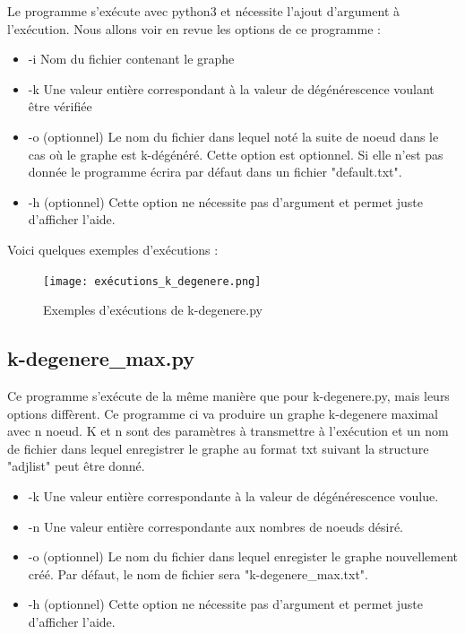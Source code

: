 \documentclass[a4paper, 11pt, oneside]{article}
\begin{document}
Le programme s'exécute avec python3 et nécessite l'ajout d'argument à l'exécution.
Nous allons voir en revue les options de ce programme :
\begin{itemize}
    \item -i Nom du fichier contenant le graphe
    \item -k Une valeur entière correspondant à la valeur de dégénérescence voulant être vérifiée
    \item -o (optionnel) Le nom du fichier dans lequel noté la suite de noeud dans le cas où 
    le graphe est k-dégénéré. Cette option est optionnel. Si elle n'est pas donnée 
    le programme écrira par défaut dans un fichier "default.txt".
    \item -h (optionnel) Cette option ne nécessite pas d'argument et permet juste d'afficher l'aide.
\end{itemize}

Voici quelques exemples d'exécutions :
\begin{figure}[h]
    \centering
    \texttt{[image: exécutions\_k\_degenere.png]}
    \caption{Exemples d'exécutions de k-degenere.py}
\end{figure}

\newpage
\subsection{k-degenere\_max.py}

Ce programme s'exécute de la même manière que pour k-degenere.py, mais leurs 
options diffèrent. Ce programme ci va produire un graphe k-degenere maximal avec 
n noeud. K et n sont des paramètres à transmettre à l'exécution et un nom 
de fichier dans lequel enregistrer le graphe au format txt suivant la structure 
"adjlist" peut être donné.

\begin{itemize}
    \item -k Une valeur entière correspondante à la valeur de dégénérescence voulue.
    \item -n Une valeur entière correspondante aux nombres de noeuds désiré.
    \item -o (optionnel) Le nom du fichier dans lequel enregister le graphe nouvellement créé. 
    Par défaut, le nom de fichier sera "k-degenere\_max.txt".
    \item -h (optionnel) Cette option ne nécessite pas d'argument et permet juste d'afficher l'aide.
\end{itemize}
\end{document}
